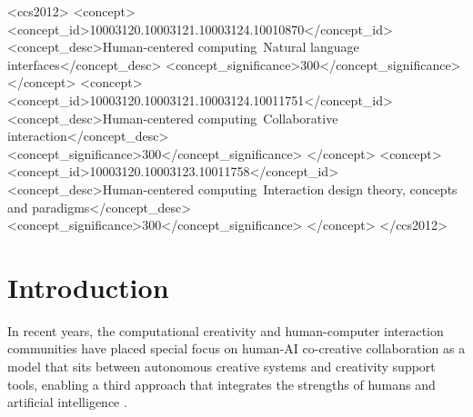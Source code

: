 \documentclass[acmlarge, nonacm, screen]{acmart} %
\begin{document}
\begin{CCSXML}
<ccs2012>
   <concept>
       <concept_id>10003120.10003121.10003124.10010870</concept_id>
       <concept_desc>Human-centered computing~Natural language interfaces</concept_desc>
       <concept_significance>300</concept_significance>
       </concept>
   <concept>
       <concept_id>10003120.10003121.10003124.10011751</concept_id>
       <concept_desc>Human-centered computing~Collaborative interaction</concept_desc>
       <concept_significance>300</concept_significance>
       </concept>
   <concept>
       <concept_id>10003120.10003123.10011758</concept_id>
       <concept_desc>Human-centered computing~Interaction design theory, concepts and paradigms</concept_desc>
       <concept_significance>300</concept_significance>
       </concept>
 </ccs2012>
\end{CCSXML}





\maketitle

\section{Introduction}

In recent years, the computational creativity and human-computer interaction communities have placed special focus on human-AI co-creative collaboration as a model that sits between autonomous creative systems and creativity support tools, enabling a third approach that integrates the strengths of humans and artificial intelligence \cite{yannakakis2014mixed} \cite{mullermixed} \cite{kantosalo2016modes} \cite{Davis2013-jy}. 
\end{document}
